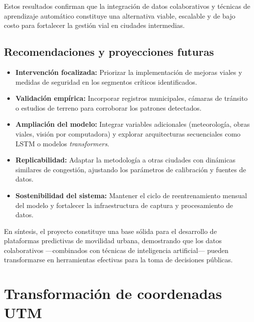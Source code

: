 \documentclass[12pt]{article}
\begin{document}
Estos resultados confirman que la integración de datos colaborativos y técnicas de aprendizaje automático constituye una alternativa viable, escalable y de bajo costo para fortalecer la gestión vial en ciudades intermedias.

\subsection*{Recomendaciones y proyecciones futuras}

\begin{itemize}
\item \textbf{Intervención focalizada:} Priorizar la implementación de mejoras viales y medidas de seguridad en los segmentos críticos identificados.
\item \textbf{Validación empírica:} Incorporar registros municipales, cámaras de tránsito o estudios de terreno para corroborar los patrones detectados.
\item \textbf{Ampliación del modelo:} Integrar variables adicionales (meteorología, obras viales, visión por computadora) y explorar arquitecturas secuenciales como LSTM o modelos \textit{transformers}.
\item \textbf{Replicabilidad:} Adaptar la metodología a otras ciudades con dinámicas similares de congestión, ajustando los parámetros de calibración y fuentes de datos.
\item \textbf{Sostenibilidad del sistema:} Mantener el ciclo de reentrenamiento mensual del modelo y fortalecer la infraestructura de captura y procesamiento de datos.
\end{itemize}

En síntesis, el proyecto constituye una base sólida para el desarrollo de plataformas predictivas de movilidad urbana, demostrando que los datos colaborativos —combinados con técnicas de inteligencia artificial— pueden transformarse en herramientas efectivas para la toma de decisiones públicas.

\newpage

\printbibliography

\newpage

\appendix

\setcounter{page}{1}

\section{Transformación de coordenadas UTM}
\label{ap:utm}
\end{document}
